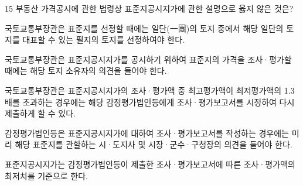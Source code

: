 \begin{question}{15}
부동산 가격공시에 관한 법령상 표준지공시지가에 관한 설명으로 옳지 않은 것은?
\begin{choices}
  \item 국토교통부장관은 표준지를 선정할 때에는 일단(一團)의 토지 중에서 해당 일단의 토지를 대표할 수 있는 필지의 토지를 선정하여야 한다.
  \item 국토교통부장관은 표준지공시지가를 공시하기 위하여 표준지의 가격을 조사·평가할 때에는 해당 토지 소유자의 의견을 들어야 한다.
  \item 국토교통부장관은 표준지공시지가의 조사·평가액 중 최고평가액이 최저평가액의 1.3배를 초과하는 경우에는 해당 감정평가법인등에게 조사·평가보고서를 시정하여 다시 제출하게 할 수 있다.
  \item 감정평가법인등은 표준지공시지가에 대하여 조사·평가보고서를 작성하는 경우에는 미리 해당 표준지를 관할하는 시·도지사 및 시장·군수·구청장의 의견을 들어야 한다.
  \item 표준지공시지가는 감정평가법인등이 제출한 조사·평가보고서에 따른 조사·평가액의 최저치를 기준으로 한다.
\end{choices}
\end{question}
